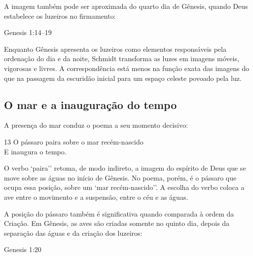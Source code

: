 A imagem também pode ser aproximada do quarto dia de Gênesis, quando Deus
estabelece os luzeiros no firmamento:

\begin{biblequote}[0.6\textwidth][14]{Genesis 1:14--19}
\end{biblequote}

Enquanto Gênesis apresenta os luzeiros como elementos responsáveis pela
ordenação do dia e da noite, Schmidt transforma as luzes em imagens móveis,
vigorosas e livres. A correspondência está menos na função exata das imagens do
que na passagem da escuridão inicial para um espaço celeste povoado pela luz.

\subsection{O mar e a inauguração do tempo}

A presença do mar conduz o poema a seu momento decisivo:

\begin{poemquote}[0.49\textwidth]{13}
O pássaro paira sobre o mar recém-nascido \\
E inaugura o tempo.
\end{poemquote}

O verbo `paira'' retoma, de modo indireto, a imagem do espírito de Deus que se
move sobre as águas no início de Gênesis. No poema, porém, é o pássaro que
ocupa essa posição, sobre um `mar recém-nascido''. A escolha do verbo coloca a
ave entre o movimento e a suspensão, entre o céu e as águas.

A posição do pássaro também é significativa quando comparada à ordem da
Criação. Em Gênesis, as aves são criadas somente no quinto dia, depois da
separação das águas e da criação dos luzeiros:

\begin{biblequote}[0.6\textwidth][20]{Genesis 1:20}
\end{biblequote}

